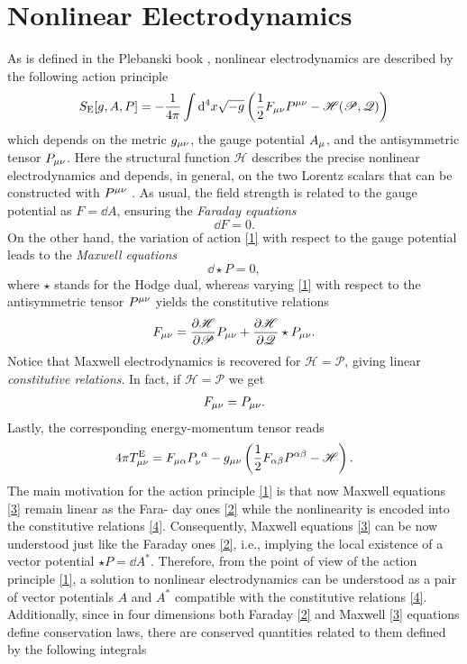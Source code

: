 \section{Nonlinear Electrodynamics}
As is defined in the Plebanski book \cite{Plebanski:1970zz}, nonlinear electrodynamics are described by the following action principle
\begin{equation}\label{1}
  S_{\rm E}[g,A,P]=-\frac{1}{4\pi }\int\dd^4 x\sqrt{-g}\left(\frac{1}{2}F_{\mu\nu }P^{\mu\nu }-\mathscr{H}(\mathscr{P},\mathscr{Q})\right)
\end{equation}
which depends on the metric $g_{\mu\nu }$, the gauge potential $A_\mu$, and the antisymmetric tensor $P_{\mu\nu }$. Here the structural function $\mathscr{H}$ describes the precise nonlinear electrodynamics and depends, in general, on the two Lorentz scalars that can be constructed with $P^{\mu\nu }$ \cite{Born:1934gh}. As usual, the field strength is related to the gauge potential as $F=\dd A$, ensuring the \textit{Faraday equations}
\begin{equation}\label{2}
  \dd F=0.
\end{equation}
On the other hand, the variation of action \eqref{1} with respect to the gauge potential leads to the \textit{Maxwell equations}
\begin{equation}\label{3}
	\dd \star P=0, 
\end{equation}
where $\star$ stands for the Hodge dual, whereas varying \eqref{1} with respect to the antisymmetric tensor $P^{\mu\nu }$ yields the constitutive relations
\begin{equation}\label{4}
  F_{\mu\nu }=\pdv{\mathscr{H}}{\mathscr{P}}P_{\mu\nu }+\pdv{\mathscr{H}}{\mathscr{Q}}\star P_{\mu\nu }.
\end{equation}
Notice that Maxwell electrodynamics is recovered for $\mathscr{H}=\mathscr{P}$, giving linear \textit{constitutive relations}. In fact, if $\mathscr{H}=\mathscr{P}$ we get
\begin{align}
  F_{\mu\nu }=P_{\mu\nu }.
\end{align}
Lastly, the corresponding energy-momentum tensor reads
\begin{equation}\label{5}
  4\pi T_{\mu\nu }^{\rm E}=F_{\mu\alpha }P_{\nu }^{~\alpha }-g_{\mu\nu }\left(\frac{1}{2}F_{\alpha\beta }P^{\alpha\beta }-\mathscr{H}\right). 
\end{equation}
The main motivation for the action principle \eqref{1} is that now Maxwell equations \eqref{3} remain linear as the Fara- day ones \eqref{2} while the nonlinearity is encoded into the constitutive relations \eqref{4}. Consequently, Maxwell equations \eqref{3} can be now understood just like the Faraday ones \eqref{2}, i.e., implying the local existence of a vector potential $\star P=\dd A^*$. Therefore, from the point of view of the action principle \eqref{1}, a solution to nonlinear electrodynamics can be understood as a pair of vector potentials $A$ and $A^*$ compatible with the constitutive relations \eqref{4}. Additionally, since in four dimensions both Faraday \eqref{2} and Maxwell \eqref{3} equations define conservation laws, there are conserved quantities related to them defined by the following integrals
